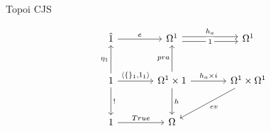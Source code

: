 \documentclass{article}
\begin{document}
\large 
\linespread{1.5} 

{\Large Topoi 
\hfill  CJS}

$$\begin{tikzcd}[column sep = large, row sep = large]
    \hat{1} \arrow[r, "e"]
    & 
    \Omega^1 \arrow[r, shift left, "h_a"] \arrow[r, shift right, "1" description]
    &
    \Omega^1   
    \\
    1 \arrow[r, "{\langle \{ \}_1, 1_1 \rangle}"] \arrow[d, "!"] \arrow[u, "\eta_1"]
    & 
    \Omega^1 \times 1 \arrow[d, "h"] \arrow[r, "h_a \times i"] \arrow[u, "pra"]
    &
    \Omega^1 \times \Omega^1 \arrow[dl, "ev"]
    \\
    1 \arrow[r, "True"]
    & 
    \Omega 
    &
        \\ 
\end{tikzcd}$$
\end{document}
